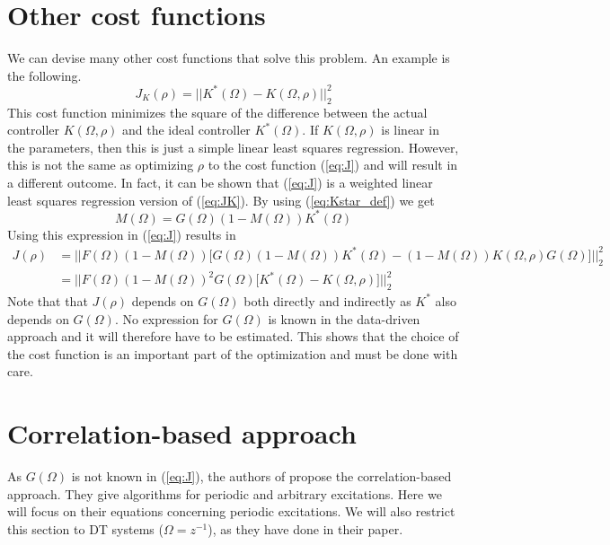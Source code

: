 \section{Other cost functions}
We can devise many other cost functions that solve this problem. An example is the following.
\begin{equation}
    J_K(\rho) = ||K^*(\Omega)-K(\Omega,\rho)||_2^2
    \label{eq:JK}
\end{equation}
This cost function minimizes the square of the difference between the actual controller $K(\Omega,\rho)$ and the ideal controller $K^*(\Omega)$. If $K(\Omega,\rho)$ is linear in the parameters, then this is just a simple linear least squares regression. However, this is not the same as optimizing $\rho$ to the cost function (\ref{eq:J}) and will result in a different outcome. In fact, it can be shown that (\ref{eq:J}) is a weighted linear least squares regression version of (\ref{eq:JK}). By using (\ref{eq:Kstar_def}) we get
\begin{equation*}
    M(\Omega) = G(\Omega) (1-M(\Omega)) K^*(\Omega)
\end{equation*}
Using this expression in (\ref{eq:J}) results in
\begin{align*}
    J(\rho) & =  \Big|\Big|F(\Omega)(1-M(\Omega)) \Big[G(\Omega) (1-M(\Omega)) K^*(\Omega)-(1-M(\Omega))K(\Omega,\rho) G(\Omega)\Big]  \Big|\Big|_2^2 \\
    &= \Big|\Big|F(\Omega)(1-M(\Omega))^2 G(\Omega) \Big[ K^*(\Omega)-K(\Omega,\rho) \Big]  \Big|\Big|_2^2 
\end{align*}
Note that that $J(\rho)$ depends on $G(\Omega)$ both directly and indirectly as $K^*$ also depends on $G(\Omega)$. No expression for $G(\Omega)$ is known in the data-driven approach and it will therefore have to be estimated.
This shows that the choice of the cost function is an important part of the optimization and must be done with care.

\section{Correlation-based approach}
\label{sec:corr_based_approach}
As $G(\Omega)$ is not known in (\ref{eq:J}), the authors of \cite{Data-driven_model_reference_control} propose the correlation-based approach. They give algorithms for periodic and arbitrary excitations. Here we will focus on their equations concerning periodic excitations. We will also restrict this section to DT systems ($\Omega = z^{-1}$), as they have done in their paper.


